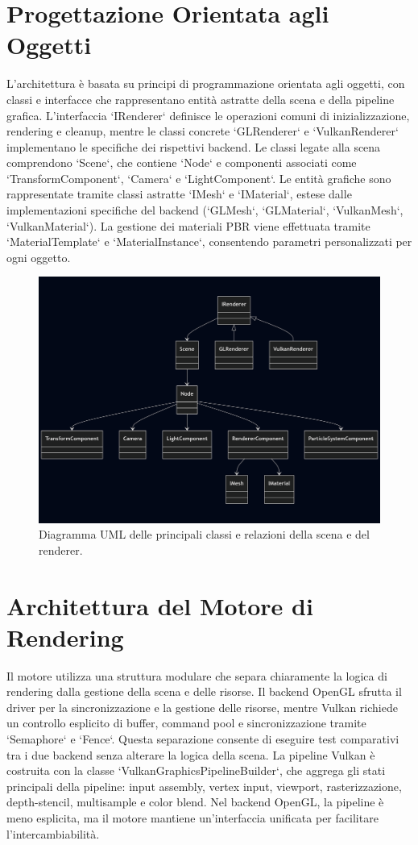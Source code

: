 \documentclass[12pt,a4paper,openright,twoside]{book}
\begin{document}
\section{Progettazione Orientata agli Oggetti}
L'architettura è basata su principi di programmazione orientata agli oggetti, con classi e interfacce che rappresentano
entità astratte della scena e della pipeline grafica. L'interfaccia `IRenderer` definisce le operazioni comuni di
inizializzazione, rendering e cleanup, mentre le classi concrete `GLRenderer` e `VulkanRenderer` implementano le
specifiche dei rispettivi backend.
Le classi legate alla scena comprendono `Scene`, che contiene `Node` e componenti associati come `TransformComponent`,
`Camera` e `LightComponent`. Le entità grafiche sono rappresentate tramite classi astratte `IMesh` e `IMaterial`, estese
dalle implementazioni specifiche del backend (`GLMesh`, `GLMaterial`, `VulkanMesh`, `VulkanMaterial`). La gestione dei
materiali PBR viene effettuata tramite `MaterialTemplate` e `MaterialInstance`, consentendo parametri personalizzati
per ogni oggetto.
\begin{figure}[H]
    \centering
    \includegraphics[width=.8\linewidth]{figures/uml_scene_renderer.png}
    \caption{Diagramma UML delle principali classi e relazioni della scena e del renderer.}
    \label{fig:uml-scene-renderer}
\end{figure}

\section{Architettura del Motore di Rendering}
Il motore utilizza una struttura modulare che separa chiaramente la logica di rendering dalla gestione della scena e
delle risorse. Il backend OpenGL sfrutta il driver per la sincronizzazione e la gestione delle risorse, mentre Vulkan
richiede un controllo esplicito di buffer, command pool e sincronizzazione tramite `Semaphore` e `Fence`. Questa
separazione consente di eseguire test comparativi tra i due backend senza alterare la logica della scena.
La pipeline Vulkan è costruita con la classe `VulkanGraphicsPipelineBuilder`, che aggrega gli stati principali della
pipeline: input assembly, vertex input, viewport, rasterizzazione, depth-stencil, multisample e color blend. Nel backend
OpenGL, la pipeline è meno esplicita, ma il motore mantiene un'interfaccia unificata per facilitare l'intercambiabilità.
\end{document}
